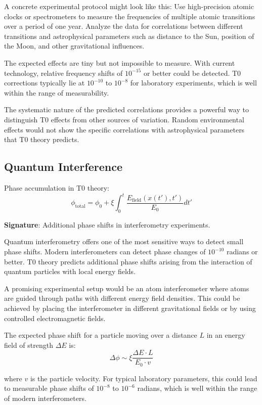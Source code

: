 \documentclass[12pt,a4paper]{article}
\newcommand{\xipar}{\xi}
\theoremstyle{definition}
\theoremstyle{remark}
\begin{document}
A concrete experimental protocol might look like this: Use high-precision atomic clocks or spectrometers to measure the frequencies of multiple atomic transitions over a period of one year. Analyze the data for correlations between different transitions and astrophysical parameters such as distance to the Sun, position of the Moon, and other gravitational influences.

The expected effects are tiny but not impossible to measure. With current technology, relative frequency shifts of $10^{-15}$ or better could be detected. T0 corrections typically lie at $10^{-10}$ to $10^{-8}$ for laboratory experiments, which is well within the range of measurability.

The systematic nature of the predicted correlations provides a powerful way to distinguish T0 effects from other sources of variation. Random environmental effects would not show the specific correlations with astrophysical parameters that T0 theory predicts.

\subsection{Quantum Interference}

Phase accumulation in T0 theory:
\begin{equation}
	\phi_{\text{total}} = \phi_0 + \xipar \int_0^t \frac{E_{\text{field}}(x(t'), t')}{E_0} dt'
	\label{eq:phase_accumulation}
\end{equation}

\textbf{Signature}: Additional phase shifts in interferometry experiments.

Quantum interferometry offers one of the most sensitive ways to detect small phase shifts. Modern interferometers can detect phase changes of $10^{-10}$ radians or better. T0 theory predicts additional phase shifts arising from the interaction of quantum particles with local energy fields.

A promising experimental setup would be an atom interferometer where atoms are guided through paths with different energy field densities. This could be achieved by placing the interferometer in different gravitational fields or by using controlled electromagnetic fields.

The expected phase shift for a particle moving over a distance $L$ in an energy field of strength $\Delta E$ is:
$$\Delta \phi \sim \xipar \frac{\Delta E \cdot L}{E_0 \cdot v}$$

where $v$ is the particle velocity. For typical laboratory parameters, this could lead to measurable phase shifts of $10^{-8}$ to $10^{-6}$ radians, which is well within the range of modern interferometers.
\end{document}
